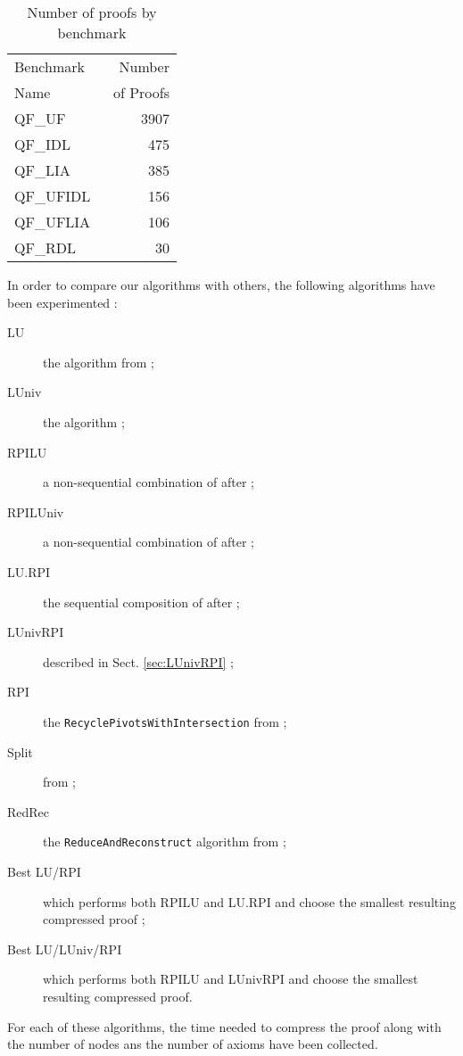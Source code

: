 \documentclass{llncs}
\begin{document}
\begin{table}[tbh]
  \caption{Number of proofs by benchmark}
  \label{tab:benchmarks}
  \centering
  \begin{tabular}{lr}
    \toprule
    Benchmark~ &  Number \\
    Name       & ~of Proofs \\
    \midrule
    QF\_UF      & 3907 \\
    QF\_IDL     &  475 \\
    QF\_LIA     &  385 \\
    QF\_UFIDL   &  156 \\
    QF\_UFLIA   &  106 \\
    QF\_RDL     &   30 \\
    \bottomrule
  \end{tabular}
\end{table}

In order to compare our algorithms with others, the following algorithms have been experimented :
\begin{description}
  \item[LU] the {\LowerUnits} algorithm from \cite{LURPI} ;
  \item[LUniv] the {\LowerUnivalents} algorithm ;
  \item[RPILU] a non-sequential combination of {\RPI} after {\LowerUnits} ;
  \item[RPILUniv] a non-sequential combination of {\RPI} after {\LowerUnivalents} ;
  \item[LU.RPI] the sequential composition of {\LowerUnits} after {\RPI} ;
  \item[LUnivRPI] described in Sect. \ref{sec:LUnivRPI} ;
  \item[RPI] the \texttt{RecyclePivotsWithIntersection} from \cite{LURPI} ;
  \item[Split] from \cite{CottonSplit} ;
  \item[RedRec] the \texttt{ReduceAndReconstruct} algorithm from \cite{RedRec} ;
  \item[Best LU/RPI] which performs both RPILU and LU.RPI and choose the smallest resulting
    compressed proof ;
  \item[Best LU/LUniv/RPI] which performs both RPILU and LUnivRPI and choose the smallest resulting
    compressed proof.
\end{description}

For each of these algorithms, the time needed to compress the proof along with the number of nodes
ans the number of axioms have been collected. 
\end{document}
